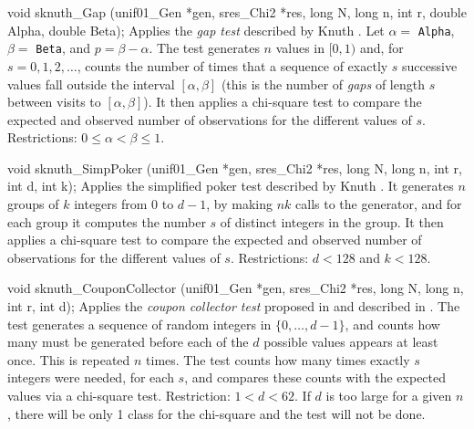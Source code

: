 void sknuth_Gap (unif01_Gen *gen, sres_Chi2 *res,
                 long N, long n, int r, double Alpha, double Beta);
\endcode
 \tab  Applies
   the {\em gap test\/} described by Knuth \cite{rKEN38a,rKEN39a,rKNU98a}.
   Let $\alpha=$ {\tt Alpha}, $\beta=$ {\tt Beta}, and $p=\beta-\alpha$.
   The test generates  $n$ values in $[0,1)$ and, for $s=0,1,2,\dots$,
   counts the number of times that a sequence of exactly $s$ successive
   values fall outside the interval $[\alpha,\beta]$
   (this is the number of {\em gaps\/} of length $s$ between visits to
   $[\alpha,\beta]$).   It then applies a chi-square test
   to compare the expected and observed number of observations for the
   different values of $s$.
   Restrictions:  $0\le\alpha < \beta\le 1$.
 \endtab
\code


void sknuth_SimpPoker (unif01_Gen *gen, sres_Chi2 *res,
                       long N, long n, int r, int d, int k);
\endcode
  \tab  Applies
   the simplified {\rm poker test\/} described by
   Knuth \cite{rKEN38a,rKEN39a,rKNU98a}.
   It generates $n$ groups of $k$ integers from 0 to $d-1$,
   by making $nk$ calls to the generator, and for each group it computes
   the number $s$ of distinct integers in the group.
   It then applies a chi-square test
   to compare the expected and observed number of observations for the
   different values of $s$.
   Restrictions: $d < 128$ and $k < 128$.
  \endtab
\code


void sknuth_CouponCollector (unif01_Gen *gen, sres_Chi2 *res,
                             long N, long n, int r, int d);
\endcode
  \tab   Applies the {\em coupon collector test\/} proposed in \cite{rGRE55a}
    and described in \cite{rKNU98a}. 
   The test generates a sequence of random integers in $\{0,\dots,d-1\}$,
   and counts how many must be generated before each of the
   $d$ possible values appears at least once.
   This is repeated $n$ times.  The test counts how many times exactly
   $s$ integers were needed, for each $s$, and compares these counts
   with the expected values via a chi-square test.
   Restriction: $1<d < 62$. If $d$ is too large for a given $n$, there
   will be only 1 class for the chi-square and the test will not be done.
 \endtab
\code


